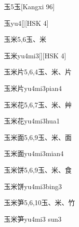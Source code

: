 \begin{Entry}{玉}{5}{⽟}[Kangxi 96]
  \begin{Phonetics}{玉}{yu4}[][HSK 4]
  \end{Phonetics}
\end{Entry}

\begin{Entry}{玉米}{5,6}{⽟、⽶}
  \begin{Phonetics}{玉米}{yu4mi3}[][HSK 4]
  \end{Phonetics}
\end{Entry}

\begin{Entry}{玉米片}{5,6,4}{⽟、⽶、⽚}
  \begin{Phonetics}{玉米片}{yu4mi3pian4}
  \end{Phonetics}
\end{Entry}

\begin{Entry}{玉米花}{5,6,7}{⽟、⽶、⾋}
  \begin{Phonetics}{玉米花}{yu4mi3hua1}
  \end{Phonetics}
\end{Entry}

\begin{Entry}{玉米面}{5,6,9}{⽟、⽶、⾯}
  \begin{Phonetics}{玉米面}{yu4mi3mian4}
  \end{Phonetics}
\end{Entry}

\begin{Entry}{玉米饼}{5,6,9}{⽟、⽶、⾷}
  \begin{Phonetics}{玉米饼}{yu4mi3bing3}
  \end{Phonetics}
\end{Entry}

\begin{Entry}{玉米笋}{5,6,10}{⽟、⽶、⽵}
  \begin{Phonetics}{玉米笋}{yu4mi3 sun3}
  \end{Phonetics}
\end{Entry}

